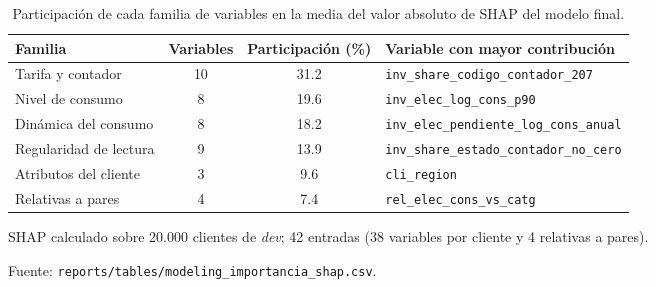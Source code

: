 \begin{table}[htbp]
  \centering
  \small
  \caption{Participación de cada familia de variables en la media del valor absoluto de SHAP del modelo final.}
  \label{tab:shap}
  \begin{threeparttable}
    \begin{tabular}{l S[table-format=2.0] S[table-format=2.1] l}
      \toprule
      {Familia} & {Variables} & {Participación (\%)} & {Variable con mayor contribución} \\
      \midrule
      Tarifa y contador & 10 & 31.2 & \texttt{inv\_share\_codigo\_contador\_207} \\
      Nivel de consumo & 8 & 19.6 & \texttt{inv\_elec\_log\_cons\_p90} \\
      Dinámica del consumo & 8 & 18.2 & \texttt{inv\_elec\_pendiente\_log\_cons\_anual} \\
      Regularidad de lectura & 9 & 13.9 & \texttt{inv\_share\_estado\_contador\_no\_cero} \\
      Atributos del cliente & 3 & 9.6 & \texttt{cli\_region} \\
      Relativas a pares & 4 & 7.4 & \texttt{rel\_elec\_cons\_vs\_catg} \\
      \bottomrule
    \end{tabular}
    \begin{tablenotes}
      \footnotesize
      \item SHAP calculado sobre 20.000 clientes de \textit{dev}; 42 entradas (38 variables por cliente y 4 relativas a pares).
      \item Fuente: \texttt{reports/tables/modeling\_importancia\_shap.csv}.
    \end{tablenotes}
  \end{threeparttable}
\end{table}
